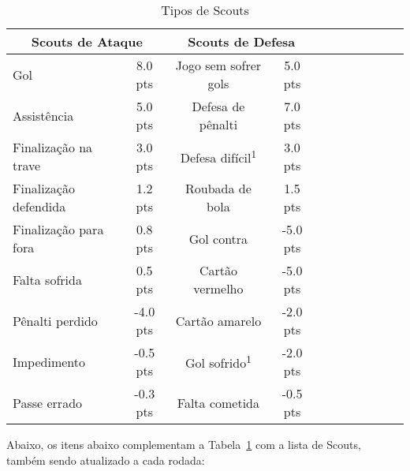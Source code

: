 \documentclass[conference]{IEEEtran}
\newcommand{\rtab}[1]{Tabela~\ref{tab:#1}}
\newcommand{\ts}{\textsuperscript}
\begin{document}
\begin{table}[h]
\begin{center}
\caption[]{Tipos de Scouts}
\label{tab:model}
\begin{tabular}{| l | c | c | c | c | c | c | c | c | c | c |}
\hline
\multicolumn{2}{|c|}{Scouts de Ataque} & \multicolumn{2}{|c|}{Scouts de Defesa} \\
\hline
Gol                   &  8.0 pts & Jogo sem sofrer gols &  5.0 pts \\
Assistência           &  5.0 pts & Defesa de pênalti    &  7.0 pts \\
Finalização na trave  &  3.0 pts & Defesa difícil\ts{1} &  3.0 pts \\
Finalização defendida &  1.2 pts & Roubada de bola      &  1.5 pts \\
Finalização para fora &  0.8 pts & Gol contra           & -5.0 pts \\
Falta sofrida         &  0.5 pts & Cartão vermelho      & -5.0 pts \\
Pênalti perdido       & -4.0 pts & Cartão amarelo       & -2.0 pts \\
Impedimento           & -0.5 pts & Gol sofrido\ts{1}    & -2.0 pts \\
Passe errado          & -0.3 pts & Falta cometida       & -0.5 pts \\
\hline
\end{tabular}
\end{center}
\end{table}

Abaixo, os  itens abaixo  complementam a \rtab{model}  com a  lista de
Scouts, também sendo atualizado a cada rodada:
\end{document}
